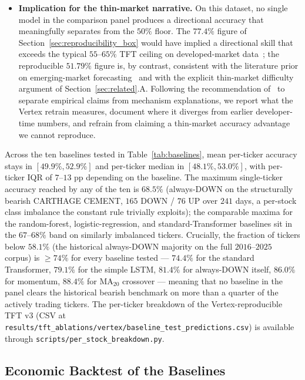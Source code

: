 \documentclass[conference]{IEEEtran}
\begin{document}
\begin{itemize}
\item \textbf{Implication for the thin-market narrative.} On this dataset, no single model in the comparison panel produces a directional accuracy that meaningfully separates from the $50\%$ floor. The $77.4\%$ figure of Section~\ref{sec:reproducibility_box} would have implied a directional skill that exceeds the typical $55$--$65\%$ TFT ceiling on developed-market data~\cite{IEEEhowto:kopka}; the reproducible $51.79\%$ figure is, by contrast, consistent with the literature prior on emerging-market forecasting~\cite{ref:bekaert_harvey,ref:harvey_multiple,ref:harvey_presidential} and with the explicit thin-market difficulty argument of Section~\ref{sec:related}.A. Following the recommendation of~\cite{ref:lipton_troubling} to separate empirical claims from mechanism explanations, we report what the Vertex retrain measures, document where it diverges from earlier developer-time numbers, and refrain from claiming a thin-market accuracy advantage we cannot reproduce.
\end{itemize}

Across the ten baselines tested in Table~\ref{tab:baselines}, mean per-ticker accuracy stays in $[49.9\%, 52.9\%]$ and per-ticker median in $[48.1\%, 53.0\%]$, with per-ticker IQR of $7$--$13$ pp depending on the baseline. The maximum single-ticker accuracy reached by any of the ten is $68.5\%$ (always-DOWN on the structurally bearish CARTHAGE CEMENT, $165$ DOWN / $76$ UP over $241$ days, a per-stock class imbalance the constant rule trivially exploits); the comparable maxima for the random-forest, logistic-regression, and standard-Transformer baselines sit in the $67$--$68\%$ band on similarly imbalanced tickers. Crucially, the fraction of tickers below $58.1\%$ (the historical always-DOWN majority on the full $2016$--$2025$ corpus) is $\geq 74\%$ for every baseline tested --- $74.4\%$ for the standard Transformer, $79.1\%$ for the simple LSTM, $81.4\%$ for always-DOWN itself, $86.0\%$ for momentum, $88.4\%$ for MA$_{20}$ crossover --- meaning that no baseline in the panel clears the historical bearish benchmark on more than a quarter of the actively trading tickers. The per-ticker breakdown of the Vertex-reproducible TFT v3 (CSV at \texttt{results/tft\_ablations/vertex/baseline\_test\_predictions.csv}) is available through \texttt{scripts/per\_stock\_breakdown.py}.

\subsection{Economic Backtest of the Baselines}\label{sec:economic_baselines}
\end{document}
